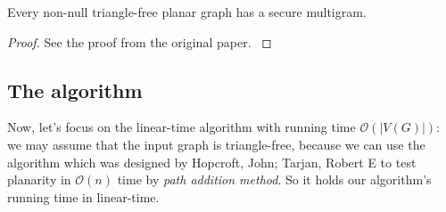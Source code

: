 \begin{theorem}
Every non-null triangle-free planar graph has a secure multigram.
\end{theorem}
\begin{proof}
See the proof from the original paper. \cite{dvorak2013threecoloring}
\end{proof}

\subsection{The algorithm}
Now, let's focus on the linear-time algorithm with running time $\mathcal{O}(|V(G)|)$:
we may assume that the input graph is triangle-free, because we can use the algorithm which was designed by Hopcroft, John; Tarjan, Robert E \cite{10.1145/321850.321852} to test planarity in $\mathcal{O}(n)$ time by \textit{path addition method}. So it holds our algorithm's running time in linear-time. 
\newcommand\mycommfont[1]{\footnotesize\ttfamily\textcolor{blue}{#1}}


